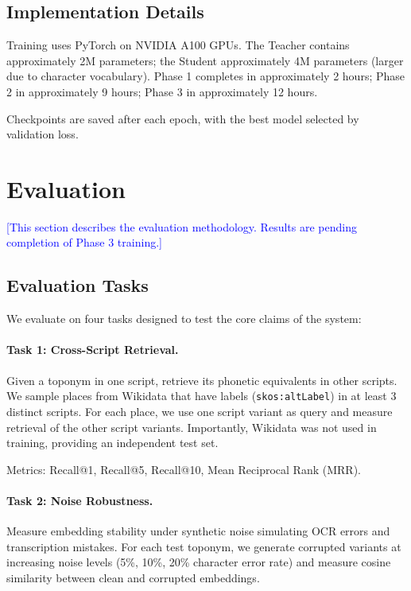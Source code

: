 \documentclass[11pt,a4paper]{article}
\newcommand{\placeholder}[1]{\textcolor{blue}{[#1]}}
\begin{document}
\subsection{Implementation Details}

Training uses PyTorch on NVIDIA A100 GPUs. The Teacher contains approximately 2M parameters; the Student approximately 4M parameters (larger due to character vocabulary). Phase 1 completes in approximately 2 hours; Phase 2 in approximately 9 hours; Phase 3 in approximately 12 hours.

Checkpoints are saved after each epoch, with the best model selected by validation loss.


\section{Evaluation}
\label{sec:evaluation}

\placeholder{This section describes the evaluation methodology. Results are pending completion of Phase 3 training.}

\subsection{Evaluation Tasks}

We evaluate on four tasks designed to test the core claims of the system:

\paragraph{Task 1: Cross-Script Retrieval.} Given a toponym in one script, retrieve its phonetic equivalents in other scripts. We sample places from Wikidata that have labels (\texttt{skos:altLabel}) in at least 3 distinct scripts. For each place, we use one script variant as query and measure retrieval of the other script variants. Importantly, Wikidata was not used in training, providing an independent test set.

Metrics: Recall@1, Recall@5, Recall@10, Mean Reciprocal Rank (MRR).

\paragraph{Task 2: Noise Robustness.} Measure embedding stability under synthetic noise simulating OCR errors and transcription mistakes. For each test toponym, we generate corrupted variants at increasing noise levels (5\%, 10\%, 20\% character error rate) and measure cosine similarity between clean and corrupted embeddings.
\end{document}
